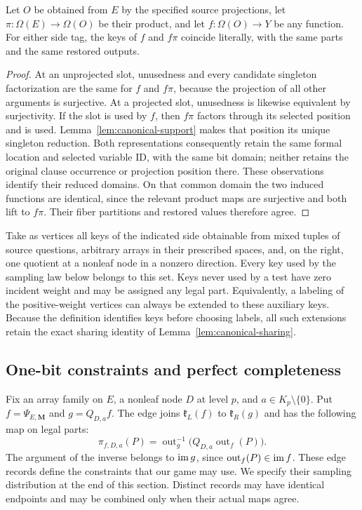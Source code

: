\begin{lemma}\label{lem:canonical-sharing}
Let $O$ be obtained from $E$ by the specified source projections, let
$\pi:\Omega(E)\to\Omega(O)$ be their product, and let
$f:\Omega(O)\to Y$ be any function.  For either side tag,
the keys of $f$ and $f\pi$ coincide literally, with the same parts and
the same restored outputs.
\end{lemma}
\begin{proof}
At an unprojected slot, unusedness and every candidate singleton
factorization are the same for $f$ and $f\pi$, because the projection
of all other arguments is surjective.  At a projected slot, unusedness
is likewise equivalent by surjectivity.  If the slot is used by $f$,
then $f\pi$ factors through its selected position and is used.
Lemma~\ref{lem:canonical-support} makes that position its unique singleton
reduction.  Both representations consequently retain the same formal
location and selected variable ID, with the same bit domain; neither
retains the original clause occurrence or projection position there.
These observations identify their reduced domains.  On that common
domain the two induced functions are identical, since the relevant
product maps are surjective and both lift to $f\pi$.
Their fiber partitions and restored values therefore agree.
\end{proof}

Take as vertices all keys of the indicated side obtainable from mixed
tuples of source questions, arbitrary arrays in their prescribed spaces,
and, on the right, one quotient at a nonleaf node in a nonzero direction.
Every key used by the sampling law below belongs to this set.  Keys never used by a
test have zero incident weight and may be assigned any legal part.
Equivalently, a labeling of the positive-weight vertices can always be
extended to these auxiliary keys.  Because the definition identifies
keys before choosing labels, all such extensions retain the exact sharing
identity of Lemma~\ref{lem:canonical-sharing}.

\subsection{One-bit constraints and perfect completeness}

Fix an array family on $E$, a nonleaf node $D$ at level $p$, and
$a\in K_p\setminus\{0\}$.  Put $f=\Psi_{E,\mathbf M}$ and
$g=Q_{D,a}f$.  The edge joins $\mathfrak k_L(f)$ to
$\mathfrak k_R(g)$ and has the following map on legal parts:
\begin{equation}\label{eq:legal-edge-map}
 \pi_{f,D,a}(P)=
    \operatorname{out}_g^{-1}
       \bigl(Q_{D,a}\operatorname{out}_f(P)\bigr).
\end{equation}
The argument of the inverse belongs to $\operatorname{im} g$, since
$\operatorname{out}_f(P)\in\operatorname{im} f$.
These edge records define the constraints that our game may use.  We specify
their sampling distribution at the end of this section.  Distinct records
may have identical endpoints and may be combined only when their actual
maps agree.

